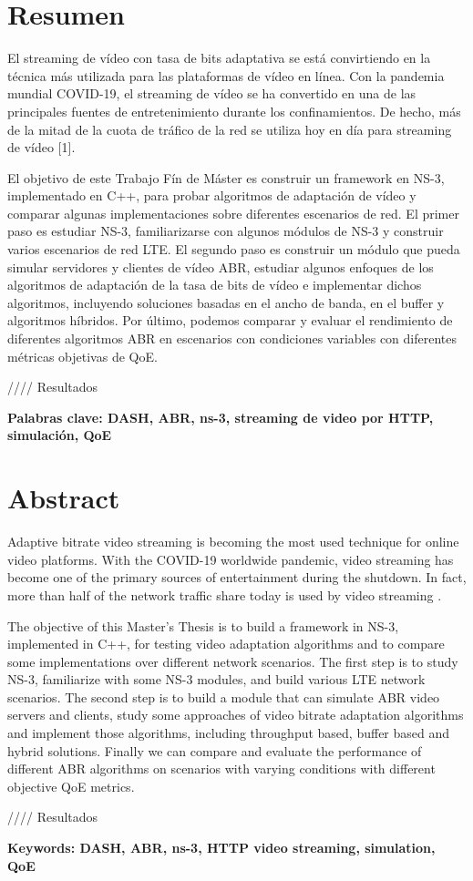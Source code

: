 \cleardoublepage
{}
\chapter*{Resumen}

El streaming de vídeo con tasa de bits adaptativa se está convirtiendo 
en la técnica más utilizada para las plataformas de vídeo en línea. 
Con la pandemia mundial COVID-19, el streaming de vídeo se ha convertido 
en una de las principales fuentes de entretenimiento durante los confinamientos. 
De hecho, más de la mitad de la cuota de tráfico de la red se utiliza hoy en 
día para streaming de vídeo [1].

El objetivo de este Trabajo Fín de Máster es construir un framework en NS-3,
implementado en C++, para probar algoritmos de adaptación de vídeo y comparar
algunas implementaciones sobre diferentes escenarios de red. El primer paso 
es estudiar NS-3, familiarizarse con algunos módulos de NS-3 y construir varios 
escenarios de red LTE. El segundo paso es construir un módulo que pueda simular 
servidores y clientes de vídeo ABR, estudiar algunos enfoques de los algoritmos
de adaptación de la tasa de bits de vídeo e implementar dichos algoritmos, 
incluyendo soluciones basadas en el ancho de banda, en el buffer y algoritmos 
híbridos. 
Por último, podemos comparar y evaluar el rendimiento de diferentes algoritmos 
ABR en escenarios con condiciones variables con diferentes métricas objetivas 
de QoE.

//// Resultados


\vfill
\textbf{Palabras clave: DASH, ABR, ns-3, streaming de video por HTTP, simulación, QoE} 


\cleardoublepage
{}
\chapter*{Abstract}

Adaptive bitrate video streaming is becoming the most used technique for online
video platforms. With the COVID-19 worldwide pandemic, video streaming has become
one of the primary sources of entertainment during the shutdown. In fact, more
than half of the network traffic share today is used by video streaming \cite{sandvine1}.

The objective of this Master's Thesis is to build a framework in NS-3, implemented
in C++, for testing video adaptation algorithms and to compare some implementations
over different network scenarios. The first step is to study NS-3, familiarize with
some NS-3 modules, and build various LTE network scenarios. The second step is to
build a module that can simulate ABR video servers and clients, study some approaches
of video bitrate adaptation algorithms and implement those algorithms, including
throughput based, buffer based and hybrid solutions. Finally we can compare and 
evaluate the performance of different ABR algorithms on scenarios with varying 
conditions with different objective QoE metrics.

//// Resultados


\vfill
\textbf{Keywords: DASH, ABR, ns-3, HTTP video streaming, simulation, QoE} 